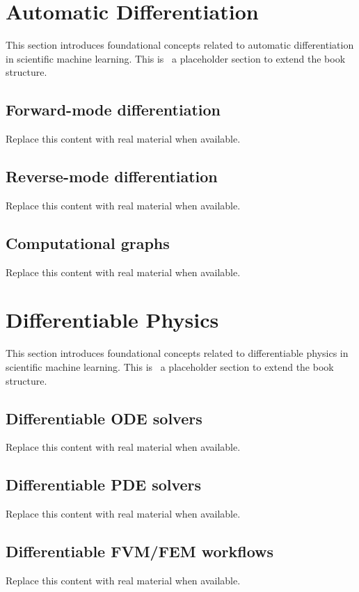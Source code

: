 
\section{Automatic Differentiation}
This section introduces foundational concepts related to automatic differentiation in scientific machine learning. This is~\cite{abdulmaksoudTransformerBasedSensorFusion2025} a placeholder section to extend the book structure.

\subsection{Forward-mode differentiation}
Replace this content with real material when available.

\subsection{Reverse-mode differentiation}
Replace this content with real material when available.

\subsection{Computational graphs}
Replace this content with real material when available.

\section{Differentiable Physics}
This section introduces foundational concepts related to differentiable physics in scientific machine learning. This is~\cite{abdulmaksoudTransformerBasedSensorFusion2025} a placeholder section to extend the book structure.

\subsection{Differentiable ODE solvers}
Replace this content with real material when available.

\subsection{Differentiable PDE solvers}
Replace this content with real material when available.

\subsection{Differentiable FVM/FEM workflows}
Replace this content with real material when available.

